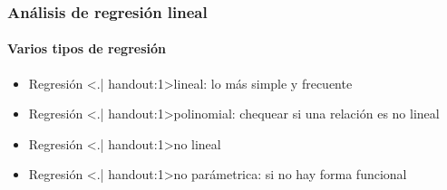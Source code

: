 \documentclass[gray,handout,mathserif]{beamer}
\begin{document}
\begin{frame}[label=linreg3]
   \frametitle{An\'alisis de regresi\'on lineal}
   \framesubtitle{Varios tipos de regresi\'on }
   \begin{itemize}
      \item Regresi\'on \structure<.| handout:1>{lineal}: lo m\'as simple y frecuente
      \item Regresi\'on \structure<.| handout:1>{polinomial}: chequear si una relaci\'on es no lineal
      \item Regresi\'on \structure<.| handout:1>{no lineal}
      \item Regresi\'on \structure<.| handout:1>{no par\'ametrica}: si no hay forma funcional
   \end{itemize}
\end{frame}%
\end{document}
